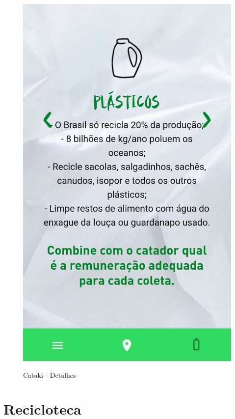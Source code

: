 \documentclass[
	12pt,				%
	openany,			%
	twoside,			%
	a4paper,			%
	english,			%
	french,				%
	spanish,			%
	brazil				%
	]{abntex2}
\begin{document}
\begin{figure}[htb]
\begin{minipage}{0.45\textwidth}
     \label{fig:figura3}
  \end{minipage}
  \hfill
  \begin{minipage}{0.45\textwidth}
    \centering
    \caption{Cataki - Detalhes}
    \includegraphics[scale=0.15]{media/catakimateriaisdetalhes.jpg}
     \label{fig:figura4}
  \end{minipage}
\end{figure}

\section{Recicloteca}
\end{document}
